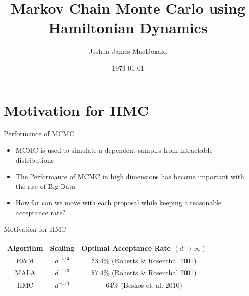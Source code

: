 \documentclass{beamer}
\title[MCMC using Hamiltonian Dynamics]{Markov Chain Monte Carlo using Hamiltonian Dynamics}
\author{Joshua James MacDonald}
\institute{}
\date{\today}
\begin{document}

\begin{frame}
  \titlepage
\end{frame}



\section{Motivation for HMC}


\begin{frame}{Performance of MCMC}

\begin{itemize}
\item MCMC is used to simulate a dependent samples from intractable distributions \vskip 5mm

\item  The Performance of MCMC in high dimensions has become important with the rise of Big Data \vskip 5mm

\item How far can we move with each proposal while keeping a reasonable acceptance rate? \vskip 5mm

\end{itemize}

\end{frame}


\begin{frame}{Motivation for HMC}

\begin{table}
\centering
\begin{tabular}{|c||c|c|}
\hline
Algorithm & Scaling & Optimal Acceptance Rate $(d \to \infty)$ \\
\hline
RWM & $d^{-1/2}$ & $23.4\%$ (Roberts \& Rosenthal 2001) \\
MALA & $d^{-1/3}$ & $57.4\%$ (Roberts \& Rosenthal 2001) \\
HMC & $d^{-1/4}$ & $64\%$ (Beskos et. al. 2010) \\
\hline
\end{tabular}
\end{table}

\end{frame}
\end{document}
